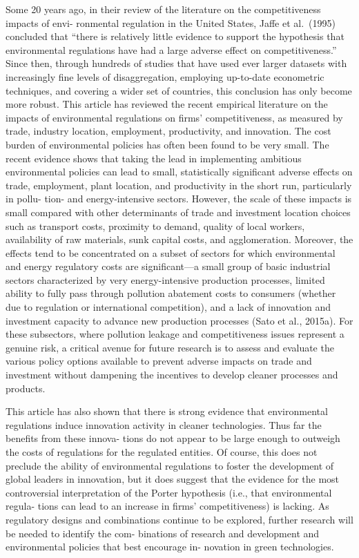 \documentclass[
]{book}
\begin{document}
Some 20 years ago, in their review of the literature on the competitiveness impacts of envi-
ronmental regulation in the United States, Jaffe et al.~(1995) concluded that ``there is relatively
little evidence to support the hypothesis that environmental regulations have had a large
adverse effect on competitiveness.'' Since then, through hundreds of studies that have used
ever larger datasets with increasingly fine levels of disaggregation, employing up-to-date
econometric techniques, and covering a wider set of countries, this conclusion has only
become more robust.
This article has reviewed the recent empirical literature on the impacts of environmental
regulations on firms' competitiveness, as measured by trade, industry location, employment,
productivity, and innovation. The cost burden of environmental policies has often been
found to be very small. The recent evidence shows that taking the lead in implementing
ambitious environmental policies can lead to small, statistically significant adverse effects on
trade, employment, plant location, and productivity in the short run, particularly in pollu-
tion- and energy-intensive sectors. However, the scale of these impacts is small compared
with other determinants of trade and investment location choices such as transport costs,
proximity to demand, quality of local workers, availability of raw materials, sunk capital
costs, and agglomeration. Moreover, the effects tend to be concentrated on a subset of sectors
for which environmental and energy regulatory costs are significant---a small group of basic
industrial sectors characterized by very energy-intensive production processes, limited ability
to fully pass through pollution abatement costs to consumers (whether due to regulation or
international competition), and a lack of innovation and investment capacity to advance new
production processes (Sato et al., 2015a). For these subsectors, where pollution leakage and
competitiveness issues represent a genuine risk, a critical avenue for future research is to
assess and evaluate the various policy options available to prevent adverse impacts on trade
and investment without dampening the incentives to develop cleaner processes and products.

This article has also shown that there is strong evidence that environmental regulations
induce innovation activity in cleaner technologies. Thus far the benefits from these innova-
tions do not appear to be large enough to outweigh the costs of regulations for the regulated
entities. Of course, this does not preclude the ability of environmental regulations to foster
the development of global leaders in innovation, but it does suggest that the evidence for the
most controversial interpretation of the Porter hypothesis (i.e., that environmental regula-
tions can lead to an increase in firms' competitiveness) is lacking. As regulatory designs and
combinations continue to be explored, further research will be needed to identify the com-
binations of research and development and environmental policies that best encourage in-
novation in green technologies.
\end{document}

